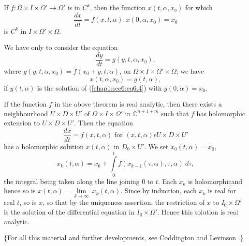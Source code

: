 \begin{coro*} %
  If $f: \Omega \times I \times \Omega' \to \Omega'$ is in $C^k$,
  then the function $x(t, \alpha , x_o)$ for which 
  $$
  \frac{dx}{dt} = f(x, t, \alpha) , x(0, \alpha, x_0) = x_0
  $$
  is $C^k$ in $I \times \Omega' \times \Omega$.
\end{coro*}

We have only to consider the equation
\begin{equation}
  \frac{dy}{dt} = g(y, t, \alpha , x_0), \tag{6.4}
\end{equation}
where $g(y, t, \alpha, x_0) = f(x_0 +  y, t, \alpha)$, on $\Omega
\times I \times \Omega' \times \Omega$; we have 
$$
x (t, \alpha, x_0) = y(t, \alpha),
$$
if $y(t, \alpha)$ is the solution of (\ref{chap1:sec6:eq6.4}) with $y
(0, \alpha) = x_0$. 

\begin{remark*}%
  If the function $f$ in the above theorem is real analytic, then
  there exists a neighbourhood $U \times D \times U'$ of $\Omega
  \times I \times \Omega'$ in $\mathbb{C}^{n+1+m}$ such that $f$ has
  holomorphic extension to $U \times D \times U'$. Then the equation 
  $$
  \frac{dx}{dt} = f(x, t, \alpha) \text { for } (x, t, \alpha) \epsilon U
  \times D \times U' 
  $$
  has a holomorphic solution $x(t, \alpha)$ in $D_0 \times U'$. We set
  $x_0 (t, \alpha) = x_0$, 
  $$
  x_k (t, \alpha) = x_0 + \int\limits_{0}^t f (x_{k -1} (\tau, \alpha),
  \tau, \alpha)~ d \tau, 
  $$
  the integral being taken along the line joining $0$ to $t$. Each
  $x_k$ is holomorphic\pageoriginale and hence so is $x(t, \alpha) = \lim\limits_{k
    \to \infty} ~ x_k (t, \alpha)$. Since by induction, each $x_k$ is
  real for real $t$, so is $x$, so that by the uniqueness assertion,
  the restriction of $x$ to $I_0 \times \Omega'$ is the  solution of
  the differential equation in $I _0 \times \Omega'$. Hence this
  solution is real analytic. 
\end{remark*}

$\{$For all this material and further developments, see Coddington
and Levinson \cite{8}.$\}$ 
